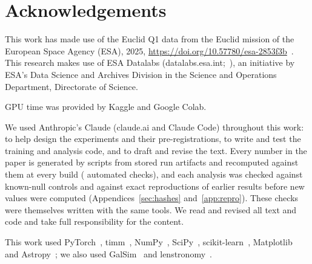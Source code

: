 \documentclass[11pt,a4paper]{article}
\begin{document}
\section*{Acknowledgements}
This work has made use of the Euclid Q1 data from the Euclid mission of the European Space
Agency (ESA), 2025, \url{https://doi.org/10.57780/esa-2853f3b}~\citep{euclidq1data}.
This research makes use of ESA Datalabs (datalabs.esa.int;~\cite{navarro2024datalabs}), an initiative by ESA's Data
Science and Archives Division in the Science and Operations Department, Directorate of
Science.

GPU time was provided by Kaggle and Google Colab.

We used Anthropic's Claude (claude.ai and Claude Code) throughout this work: to help design
the experiments and their pre-registrations, to write and test the training and analysis code,
and to draft and revise the text. Every number in the paper is generated by scripts from stored
run artifacts and recomputed against them at every build (\nCrossChecks{} automated checks), and
each analysis was checked against known-null controls and against exact reproductions of earlier
results before new values were computed (Appendices~\ref{sec:hashes} and~\ref{app:repro}). These
checks were themselves written with the same tools. We read and revised all text and code and
take full responsibility for the content.

This work used PyTorch~\citep{paszke2019pytorch}, timm~\citep{wightman2019timm},
NumPy~\citep{harris2020numpy}, SciPy~\citep{virtanen2020scipy},
scikit-learn~\citep{pedregosa2011sklearn}, Matplotlib~\citep{hunter2007matplotlib} and
Astropy~\citep{astropy2022}; we also used GalSim~\citep{rowe2015galsim} and
lenstronomy~\citep{birrer2018lenstronomy,birrer2021lenstronomy}.
\end{document}
